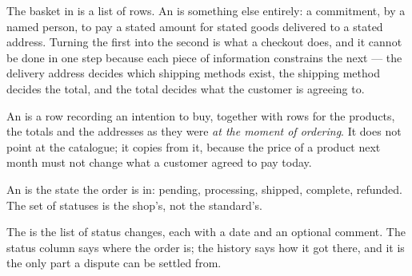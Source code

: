 The basket in  is a list of rows. An  is something
else entirely: a commitment, by a named person, to pay a stated amount for
stated goods delivered to a stated address. Turning the first into the second
is what a checkout does, and it cannot be done in one step because each piece
of information constrains the next --- the delivery address decides which
shipping methods exist, the shipping method decides the total, and the total
decides what the customer is agreeing to.

\begin{definitionbox}
An  is a row recording an intention to buy, together with rows for
the products, the totals and the addresses as they were \emph{at the moment of
ordering}. It does not point at the catalogue; it copies from it, because the
price of a product next month must not change what a customer agreed to pay
today.

\smallskip
An  is the state the order is in: pending, processing,
shipped, complete, refunded. The set of statuses is the shop's, not the
standard's.

\smallskip
The  is the list of status changes, each with a date and
an optional comment. The status column says where the order is; the history
says how it got there, and it is the only part a dispute can be settled from.
\end{definitionbox}

